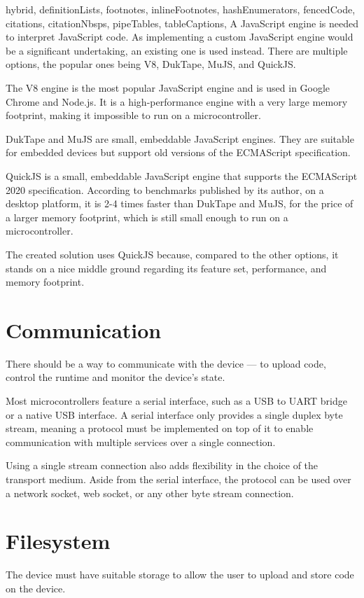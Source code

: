 \begin{markdown*}{%
  hybrid,
  definitionLists,
  footnotes,
  inlineFootnotes,
  hashEnumerators,
  fencedCode,
  citations,
  citationNbsps,
  pipeTables,
  tableCaptions,
}
A JavaScript engine is needed to interpret JavaScript code. As implementing a custom JavaScript engine would be a significant undertaking, an existing one is used instead. There are multiple options, the popular ones being V8\cite{v8}, DukTape\cite{duktape}, MuJS\cite{mujs}, and QuickJS\cite{quickjs}.

The V8 engine is the most popular JavaScript engine and is used in Google Chrome and Node.js. It is a high-performance engine with a very large memory footprint, making it impossible to run on a microcontroller.

DukTape and MuJS are small, embeddable JavaScript engines. They are suitable for embedded devices but support old versions of the ECMAScript specification.

QuickJS is a small, embeddable JavaScript engine that supports the ECMAScript 2020 specification. According to benchmarks published by its author\cite{quickjs-bench}, on a desktop platform, it is 2-4 times faster than DukTape and MuJS, for the price of a larger memory footprint, which is still small enough to run on a microcontroller.

The created solution uses QuickJS because, compared to the other options, it stands on a nice middle ground regarding its feature set, performance, and memory footprint.

\section{Communication}

There should be a way to communicate with the device --- to upload code, control the runtime and monitor the device's state.

Most microcontrollers feature a serial interface, such as a USB to UART bridge or a native USB interface. A serial interface only provides a single duplex byte stream, meaning a protocol must be implemented on top of it to enable communication with multiple services over a single connection.

Using a single stream connection also adds flexibility in the choice of the transport medium. Aside from the serial interface, the protocol can be used over a network socket, web socket, or any other byte stream connection.

\section{Filesystem}

The device must have suitable storage to allow the user to upload and store code on the device.


\end{markdown*}
